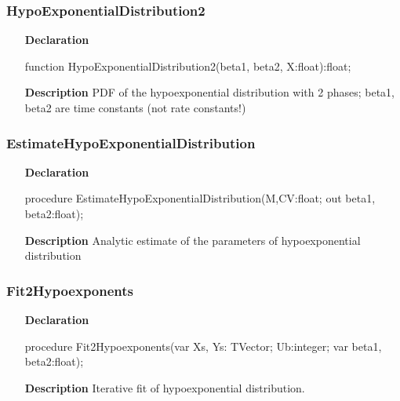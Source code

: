 \documentclass[12pt,a4paper,oneside]{report}
\newcommand{\declarationitem}[1]{\textbf{#1}}
\newcommand{\descriptiontitle}[1]{\textbf{#1}}
\begin{document}
\subsubsection{HypoExponentialDistribution2}
\label{udistribs-HypoExponentialDistribution2}
\begin{itemize}\item[\declarationitem{Declaration}\hfill]
	\begin{flushleft}
		\begin{ttfamily}
			function HypoExponentialDistribution2(beta1, beta2, X:float):float;\end{ttfamily}
		
	\end{flushleft}
	
	\par
	\item[\descriptiontitle{Description}]
	PDF of the hypoexponential distribution with 2 phases; beta1, beta2 are time constants (not rate constants!)
	
\end{itemize}
\subsubsection{EstimateHypoExponentialDistribution}
\label{udistribs-EstimateHypoExponentialDistribution}
\begin{itemize}\item[\declarationitem{Declaration}\hfill]
	\begin{flushleft}
		\begin{ttfamily}
			procedure EstimateHypoExponentialDistribution(M,CV:float; out beta1, beta2:float);\end{ttfamily}
		
	\end{flushleft}
	
	\par
	\item[\descriptiontitle{Description}]
	Analytic estimate of the parameters of hypoexponential distribution
	
\end{itemize}
\subsubsection{Fit2Hypoexponents}
\label{udistribs-Fit2Hypoexponents}
\begin{itemize}\item[\declarationitem{Declaration}\hfill]
	\begin{flushleft}
		\begin{ttfamily}
			procedure Fit2Hypoexponents(var Xs, Ys: TVector; Ub:integer; var beta1, beta2:float);\end{ttfamily}
		
	\end{flushleft}
	
	\par
	\item[\descriptiontitle{Description}]
	Iterative fit of hypoexponential distribution.
	
\end{itemize}
\end{document}
